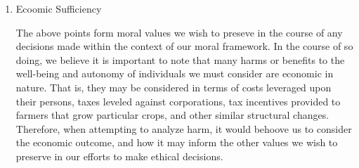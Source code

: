 \begin{enumerate}
  \item Ecoomic Sufficiency
    \begin{pointenv}
      The above points form moral values we wish to preseve in the 
      course of any decisions made within the context of our moral framework.  
      In the course of so doing, we believe it is important to note that 
      many harms or benefits to the well-being and autonomy of individuals 
      we must consider are economic in nature.  That is, they may be 
      considered in terms of costs leveraged upon their persons, taxes 
      leveled against corporations, tax incentives provided to 
      farmers that grow particular crops, and other similar structural 
      changes.  Therefore, when attempting to analyze harm, it would 
      behoove us to consider the economic outcome, and how it may inform 
      the other values we wish to preserve in our efforts to make 
      ethical decisions.
    \end{pointenv}
\end{enumerate}

